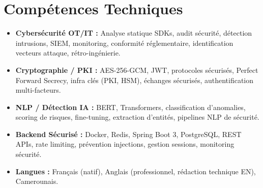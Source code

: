 \documentclass[a4paper,11pt]{article}
\begin{document}
\section{Comp\'etences Techniques}
\begin{itemize}[leftmargin=*, nosep]
    \item \small{\textbf{Cybersécurité OT/IT :} Analyse statique SDKs, audit sécurité, détection intrusions, SIEM, monitoring, conformité réglementaire, identification vecteurs attaque, rétro-ingénierie.}
    \item \small{\textbf{Cryptographie / PKI :} AES-256-GCM, JWT, protocoles sécurisés, Perfect Forward Secrecy, infra clés (PKI, HSM), échanges sécurisés, authentification multi-facteurs.}
    \item \small{\textbf{NLP / Détection IA :} BERT, Transformers, classification d'anomalies, scoring de risques, fine-tuning, extraction d'entités, pipelines NLP de sécurité.}
    \item \small{\textbf{Backend Sécurisé :} Docker, Redis, Spring Boot 3, PostgreSQL, REST APIs, rate limiting, prévention injections, gestion sessions, monitoring sécurité.}
    \item \small{\textbf{Langues :} Français (natif), Anglais (professionnel, rédaction technique EN), Camerounais.}
\end{itemize}
\end{document}
